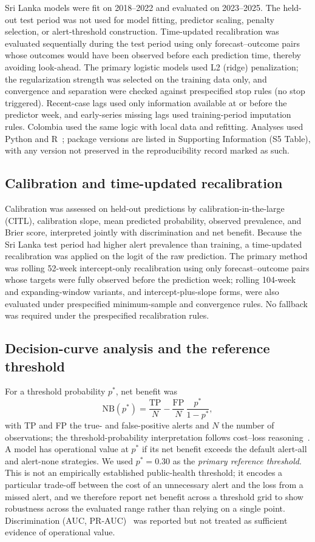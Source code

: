 \documentclass[11pt,a4paper]{article}
\begin{document}
Sri Lanka models were fit on 2018--2022 and evaluated on 2023--2025. The held-out test period was not used for model fitting, predictor scaling, penalty selection, or alert-threshold construction. Time-updated recalibration was evaluated sequentially during the test period using only forecast--outcome pairs whose outcomes would have been observed before each prediction time, thereby avoiding look-ahead. The primary logistic models used L2 (ridge) penalization; the regularization strength was selected on the training data only, and convergence and separation were checked against prespecified stop rules (no stop triggered). Recent-case lags used only information available at or before the predictor week, and early-series missing lags used training-period imputation rules. Colombia used the same logic with local data and refitting. Analyses used Python and R~\cite{RCoreTeam2024}; package versions are listed in Supporting Information (S5 Table), with any version not preserved in the reproducibility record marked as such.

\subsection{Calibration and time-updated recalibration}
Calibration was assessed on held-out predictions by calibration-in-the-large (CITL), calibration slope, mean predicted probability, observed prevalence, and Brier score, interpreted jointly with discrimination and net benefit. Because the Sri Lanka test period had higher alert prevalence than training, a time-updated recalibration was applied on the logit of the raw prediction. The primary method was rolling 52-week intercept-only recalibration using only forecast--outcome pairs whose targets were fully observed before the prediction week; rolling 104-week and expanding-window variants, and intercept-plus-slope forms, were also evaluated under prespecified minimum-sample and convergence rules. No fallback was required under the prespecified recalibration rules.

\subsection{Decision-curve analysis and the reference threshold}
For a threshold probability $p^*$, net benefit was
\[
\mathrm{NB}(p^*)=\frac{\mathrm{TP}}{N}-\frac{\mathrm{FP}}{N}\,\frac{p^*}{1-p^*},
\]
with TP and FP the true- and false-positive alerts and $N$ the number of observations; the threshold-probability interpretation follows cost--loss reasoning~\cite{Vickers2006,Murphy1985,Tozan2023}. A model has operational value at $p^*$ if its net benefit exceeds the default alert-all and alert-none strategies. We used $p^*=0.30$ as the \emph{primary reference threshold}. This is not an empirically established public-health threshold; it encodes a particular trade-off between the cost of an unnecessary alert and the loss from a missed alert, and we therefore report net benefit across a threshold grid to show robustness across the evaluated range rather than relying on a single point. Discrimination (AUC, PR-AUC)~\cite{SaitoRehmsmeier2015} was reported but not treated as sufficient evidence of operational value.
\end{document}
